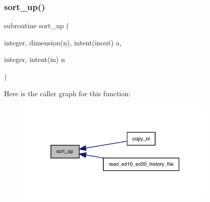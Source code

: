 \subsubsection{\texorpdfstring{sort\+\_\+up()}{sort\_up()}}
{\footnotesize\ttfamily subroutine sort\+\_\+up (\begin{DoxyParamCaption}\item[{integer, dimension(n), intent(inout)}]{a,  }\item[{integer, intent(in)}]{n }\end{DoxyParamCaption})}

Here is the caller graph for this function\+:
\nopagebreak
\begin{figure}[H]
\begin{center}
\leavevmode
\includegraphics[width=271pt]{numutils_8f90_a0ce70697995bdbb28ca0f7de92ba5210_icgraph}
\end{center}
\end{figure}
